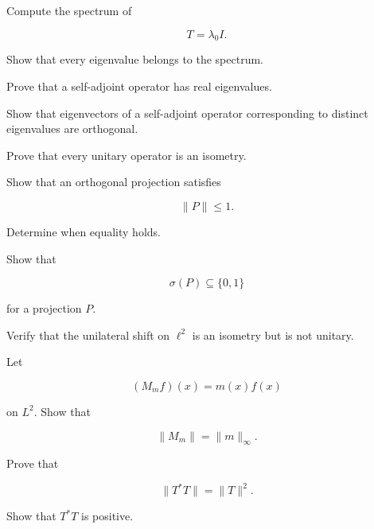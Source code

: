 \begin{exercise}[2]
Compute the spectrum of

\[
T=\lambda_0I.
\]
\end{exercise}

\begin{exercise}[2]
Show that every eigenvalue belongs to the spectrum.
\end{exercise}

\begin{exercise}[2]
Prove that a self-adjoint operator has real eigenvalues.
\end{exercise}

\begin{exercise}[2]
Show that eigenvectors of a self-adjoint operator corresponding to
distinct eigenvalues are orthogonal.
\end{exercise}

\begin{exercise}[2]
Prove that every unitary operator is an isometry.
\end{exercise}

\begin{exercise}[2]
Show that an orthogonal projection satisfies

\[
\|P\|\leq1.
\]

Determine when equality holds.
\end{exercise}

\begin{exercise}[2]
Show that

\[
\sigma(P)\subseteq\{0,1\}
\]

for a projection \(P\).
\end{exercise}

\begin{exercise}[2]
Verify that the unilateral shift on \(\ell^2\) is an isometry but is not
unitary.
\end{exercise}

\begin{exercise}[2]
Let

\[
(M_mf)(x)=m(x)f(x)
\]

on \(L^2\). Show that

\[
\|M_m\|=\|m\|_\infty.
\]
\end{exercise}

\begin{exercise}[3]
Prove that

\[
\|T^*T\|=\|T\|^2.
\]
\end{exercise}

\begin{exercise}[3]
Show that \(T^*T\) is positive.
\end{exercise}

